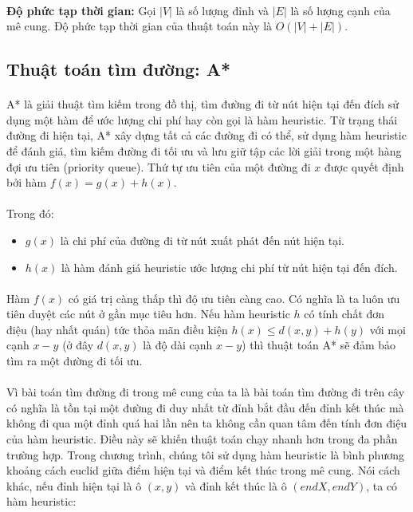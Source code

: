 \paragraph{}{\textbf{Độ phức tạp thời gian:} Gọi $|V|$ là số lượng đỉnh và $|E|$ là số lượng cạnh của mê cung. Độ phức tạp thời gian của thuật toán này là $O(|V|+|E|)$.}


\subsection{Thuật toán tìm đường: A*} 
\paragraph{}{A* \cite{astar} là giải thuật tìm kiếm trong đồ thị, tìm đường đi từ nút hiện tại đến đích sử dụng một hàm để ước lượng chi phí hay còn gọi là hàm heuristic. Từ trạng thái đường đi hiện tại, A* xây dựng tất cả các đường đi có thể, sử dụng hàm heuristic để đánh giá, tìm kiếm đường đi tối ưu và lưu giữ tập các lời giải trong một hàng đợi ưu tiên (priority queue). Thứ tự ưu tiên của một đường đi $x$ được quyết định bởi hàm $f(x) = g(x) + h(x)$.}
\paragraph{}{Trong đó:}
\begin{itemize}
    \item $g(x)$ là chi phí của đường đi từ nút xuất phát đến nút hiện tại.
    \item $h(x)$ là hàm đánh giá heuristic ước lượng chi phí từ nút hiện tại đến đích.
\end{itemize}
\paragraph{}{Hàm $f(x)$ có giá trị càng thấp thì độ ưu tiên càng cao. Có nghĩa là ta luôn ưu tiên duyệt các nút ở gần mục tiêu hơn. Nếu hàm heuristic $h$ có tính chất đơn điệu (hay nhất quán) tức thỏa mãn điều kiện $h(x) \leq d(x, y) + h(y)$ với mọi cạnh $x - y$ (ở đây $d(x, y)$ là độ dài cạnh $x - y$) thì thuật toán A* sẽ đảm bảo tìm ra một đường đi tối ưu.}
\paragraph{}{Vì bài toán tìm đường đi trong mê cung của ta là bài toán tìm đường đi trên cây có nghĩa là tồn tại một đường đi duy nhất từ đỉnh bắt đầu đến đỉnh kết thúc mà không đi qua một đỉnh quá hai lần nên ta không cần quan tâm đến tính đơn điệu của hàm heuristic. Điều này sẽ khiến thuật toán chạy nhanh hơn trong đa phần trường hợp. Trong chương trình, chúng tôi sử dụng hàm heuristic là bình phương khoảng cách euclid giữa điểm hiện tại và điểm kết thúc trong mê cung. Nói cách khác, nếu đỉnh hiện tại là ô $(x, y)$ và đỉnh kết thúc là ô $(endX, endY)$, ta có hàm heuristic:}

